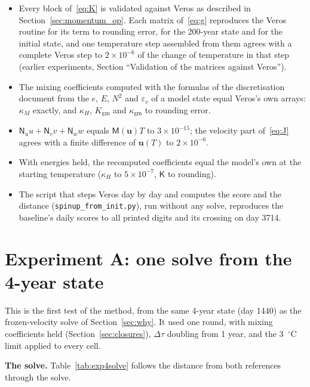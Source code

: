 \documentclass{article}
\begin{document}
\begin{itemize}
\item Every block of~\eqref{eq:K} is validated against Veros as described in Section~\ref{sec:momentum_op}. Each matrix of~\eqref{eq:g} reproduces the Veros routine for its term to rounding error, for the 200-year state and for the initial state, and one temperature step assembled from them agrees with a complete Veros step to $2\times10^{-6}$ of the change of temperature in that step (earlier experiments, Section ``Validation of the matrices against Veros'').
\item The mixing coefficients computed with the formulas of the discretisation document from the $e$, $E$, $N^2$ and $\varepsilon_v$ of a model state equal Veros's own arrays: $\kappa_M$ exactly, and $\kappa_H$, $K_\text{gm}$ and $\kappa_\text{gm}$ to rounding error.
\item $\mathsf{N}_u u+\mathsf{N}_v v+\mathsf{N}_w w$ equals $\mathsf{M}(\mathbf{u})T$ to $3\times10^{-15}$; the velocity part of~\eqref{eq:J} agrees with a finite difference of $\mathbf{u}(T)$ to $2\times10^{-6}$.
\item With energies held, the recomputed coefficients equal the model's own at the starting temperature ($\kappa_H$ to $5\times10^{-7}$, $\mathsf{K}$ to rounding).
\item The script that steps Veros day by day and computes the score and the distance (\texttt{spinup\_from\_init.py}), run without any solve, reproduces the baseline's daily scores to all printed digits and its crossing on day 3714.
\end{itemize}

\section{Experiment A: one solve from the 4-year state}\label{sec:exp4yr}

This is the first test of the method, from the same 4-year state (day 1440) as the frozen-velocity solve of Section~\ref{sec:why}. It used one round, with mixing coefficients held (Section~\ref{sec:closures}), $\Delta\tau$ doubling from 1 year, and the 3~$^\circ$C limit applied to every cell.

\textbf{The solve.} Table~\ref{tab:exp4solve} follows the distance from both references through the solve.
\end{document}
